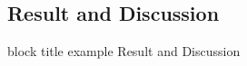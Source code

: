 \begin{frame}
	\section{Result and Discussion}
	\begin{beamercolorbox}[rounded=true]{block title example}
		\centering
		\LARGE
		Result and Discussion
	\end{beamercolorbox}
\end{frame}


%		
%		
